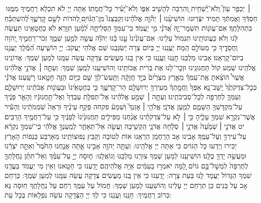 \documentclass[twoside, openany, parskip=half, 11pt]{book}
\begin{document}
 ׀ יְכַפֵּ֥ר עָוֺן֮ וְֽלֹא־יַֽ֫שְׁחִ֥ית וְ֭הִרְבָּה לְהָשִׁ֣יב אַפּ֑וֹ וְלֹא־יָ֝עִ֗יר כׇּל־חֲמָתֽוֹ׃  אַתָּה יְיָ לֹא תִכְלָא רַחֲמֶיךָ מִמֶּֽנּוּ חַסְדְּֿךָ וַאֲמִתְּֿךָ תָּמִיד יִצְּֿרֽוּנוּ: הוֹשִׁיעֵ֨נוּ ׀ יְהֹ֘וָ֤ה אֱלֹהֵ֗ינוּ וְקַבְּצֵנוּ֮ מִֽן־הַגּ֫וֹיִ֥ם לְ֭הֹדוֹת לְשֵׁ֣ם קׇדְשֶׁ֑ךָ לְ֝הִשְׁתַּבֵּ֗חַ בִּתְהִלָּתֶֽךָ׃ 
אִם־עֲוֺנ֥וֹת תִּשְׁמׇר־יָ֑הּ אֲ֝דֹנָ֗י מִ֣י יַעֲמֹֽד׃  כִּֽי־עִמְּךָ֥ הַסְּלִיחָ֑ה לְ֝מַ֗עַן תִּוָּרֵֽא׃  לֹא כַחֲטָאֵֽינוּ תַּעֲשֶׂה לָּנוּ וְלֹא כַעֲוֹנוֹתֵֽינוּ תִּגְמוֹל עָלֵינוּ:
אִם־עֲוֺנֵ֙ינוּ֙ עָ֣נוּ בָ֔נוּ יְהֹוָ֕ה עֲשֵׂ֖ה לְמַ֣עַן שְׁמֶ֑ךָ זְכֹר־רַחֲמֶ֣יךָ יְ֭הֹוָה וַחֲסָדֶ֑יךָ כִּ֖י מֵעוֹלָ֣ם הֵֽמָּה׃ יַעֲנֵֽנוּ יְיָ בְּיוֹם צָרָה יְשַׂגְּבֵֽנוּ שֵׁם אֱלֹהֵי יַעֲקֹב:
יְיָ֥  הוֹשִׁ֑יעָה הַ֝מֶּ֗לֶךְ יַעֲנֵ֥נוּ בְיוֹם־קׇרְאֵֽנוּ׃ 
 אָבִֽינוּ מַלְכֵּֽנוּ חׇנֵּֽנוּ וַעֲנֵֽנוּ כִּי אֵין בָּֽנוּ מַעֲשִׂים צְדָקָה עֲשֵׂה עִמָּֽנוּ לְמַעַן שְׁמֶךָ:
 אֲדוֹנֵֽינוּ אֱלֹהֵֽינוּ שְׁמַע קוֹל תַּחֲנוּנֵֽינוּ וּזְכׇר־לָנוּ אֶת בְּרִית אֲבוֹתֵֽינוּ וְהוֹשִׁיעֵֽנוּ לְמַֽעַן שְׁמֶךָ:
וְעַתָּ֣ה ׀ אֲדֹנָ֣י אֱלֹהֵ֗ינוּ אֲשֶׁר֩ הוֹצֵ֨אתָ אֶֽת־עַמְּךָ֜ מֵאֶ֤רֶץ מִצְרַ֙יִם֙ בְּיָ֣ד חֲזָקָ֔ה וַתַּֽעַשׂ־לְךָ֥ שֵׁ֖ם כַּיּ֣וֹם הַזֶּ֑ה חָטָ֖אנוּ רָשָֽׁעְנוּ׃ אֲדֹנָ֗י כְּכׇל־צִדְקֹתֶ֙ךָ֙ יָֽשׇׁב־נָ֤א אַפְּךָ֙ וַחֲמָ֣תְךָ֔ מֵעִֽירְךָ֥ יְרוּשָׁלַ֖‍ִם הַר־קׇדְשֶׁ֑ךָ כִּ֤י בַחֲטָאֵ֙ינוּ֙ וּבַעֲוֺנ֣וֹת אֲבֹתֵ֔ינוּ יְרוּשָׁלַ֧‍ִם וְעַמְּךָ֛ לְחֶרְפָּ֖ה לְכׇל־סְבִיבֹתֵֽינוּ׃ וְעַתָּ֣ה ׀ שְׁמַ֣ע אֱלֹהֵ֗ינוּ אֶל־תְּפִלַּ֤ת עַבְדְּךָ֙ וְאֶל־תַּ֣חֲנוּנָ֔יו וְהָאֵ֣ר פָּנֶ֔יךָ עַל־מִקְדָּשְׁךָ֖ הַשָּׁמֵ֑ם לְמַ֖עַן אֲדֹנָֽי׃
אֱלֹהַ֥י ׀ אׇזְנְךָ֮ וּֽשְׁמָע֒ פקחה פְּקַ֣ח עֵינֶ֗יךָ וּרְאֵה֙ שֹֽׁמְמֹתֵ֔ינוּ וְהָעִ֕יר אֲשֶׁר־נִקְרָ֥א שִׁמְךָ֖ עָלֶ֑יהָ כִּ֣י ׀ לֹ֣א עַל־צִדְקֹתֵ֗ינוּ אֲנַ֨חְנוּ מַפִּילִ֤ים תַּחֲנוּנֵ֙ינוּ֙ לְפָנֶ֔יךָ כִּ֖י עַל־רַחֲמֶ֥יךָ הָרַבִּֽים׃ יט אֲדֹנָ֤י ׀ שְׁמָ֙עָה֙ אֲדֹנָ֣י ׀ סְלָ֔חָה אֲדֹנָ֛י הַֽקְשִׁ֥יבָה וַעֲשֵׂ֖ה אַל־תְּאַחַ֑ר לְמַֽעַנְךָ֣ אֱלֹהַ֔י כִּֽי־שִׁמְךָ֣ נִקְרָ֔א עַל־עִירְךָ֖ וְעַל־עַמֶּֽךָ׃ אָבִֽינוּ אָב הָרַחֲמָן הַרְאֵֽנוּ אוֹת לְטוֹבָה וְקַבֵּץ נְפוּצוֹתֵֽינוּ מֵאַרְבַּע כַּנְפוֹת הָאָרֶץ יַכִּירוּ וְיֵדְעוּ כָּל הַגּוֹיִם כִּי אַתָּה יְיָ אֱלֹהֵֽינוּ: 
וְעַתָּ֥ה יְהֹוָ֖ה אָבִ֣ינוּ אָ֑תָּה אֲנַ֤חְנוּ הַחֹ֙מֶר֙ וְאַתָּ֣ה יֹצְרֵ֔נוּ וּמַעֲשֵׂ֥ה יָדְךָ֖ כֻּלָּֽנוּ׃ הוֹשִׁיעֵֽנוּ לְמַעַן שְׁמֶךָ צוּרֵֽנוּ מַלְכֵּֽנוּ וְגוֹאֲלֵֽנוּ:
ח֧וּסָה יְיָ֣ עַל־עַמֶּ֗ךָ וְאַל־תִּתֵּ֨ן נַחֲלָתְךָ֤ לְחֶרְפָּה֙ לִמְשׇׁל־בָּ֣ם גּוֹיִ֔ם לָ֚מָּה יֹאמְר֣וּ בָעַמִּ֔ים אַיֵּ֖ה אֱלֹהֵיהֶֽם׃ יָדַֽעְנוּ כִּי חָטָֽאנוּ וְאֵין מִי יַעֲמֹד בַּעֲדֵֽנוּ שִׁמְךָ הַגָּדוֹל יַעֲמָד לָֽנוּ בְּעֵת צָרָה: יָדַֽעְנוּ כִּי אֵין בָּֽנוּ מַעֲשִׂים צְדָקָה עֲשֵׂה עִמָּֽנוּ לְמַעַן שְׁמֶֽךָ: כְּרַחֵם אָב עַל בָּנִים כֵּן תְּרַחֵם יְיָ עָלֵינוּ וְהוֹשִׁעֵֽנוּ לְמַעַן שְׁמֶךָ: חֲמוֹל עַל עַמֶּֽךָ רַחֵם עַל נַחֲלָתֶֽךָ חֽוּסָה נָּא כְּרוֹב רַחֲמֶיךָ: חָנֵּֽנוּ וַעֲנֵֽנוּ כִּי לְךָ יְיָ הַצְּֿדָקָה עֹשֵׂה נִפְלָאוֹת בְּכָל עֵת:
\end{document}
